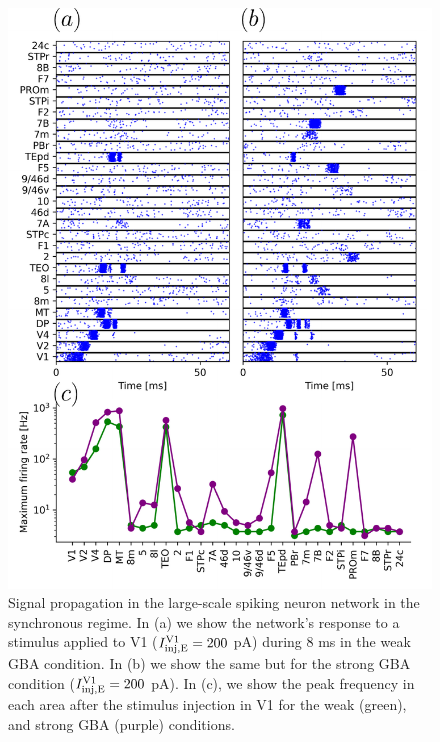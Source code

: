 \begin{figure}[!ht]
 \centering
     \includegraphics[scale=0.6]{figures/fig6.pdf}
 \caption{Signal propagation in the large-scale spiking neuron network in the synchronous regime. In (a) we show the network's response to a stimulus applied to V1 ($I_{\rm inj, E}^{\rm V1} = 200$ pA) during $8$ ms in the weak GBA condition. In (b) we show the same but for the strong GBA condition  ($I_{\rm inj, E}^{\rm V1} = 200$ pA). In (c), we show the peak frequency in each area after the stimulus injection in V1 for the weak (green), and strong GBA (purple) conditions. }\label{fig:fig4}
\end{figure}

